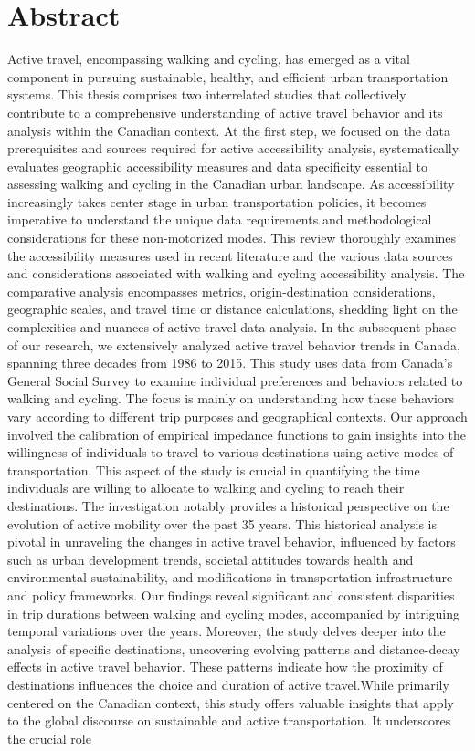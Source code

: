 \documentclass[
11pt, %
oneside, %
english, %
singlespacing, %
]{macthesis} %
\begin{document}
\section*{\Huge Abstract}
\addchaptertocentry{\abstractname}
Active travel, encompassing walking and cycling, has emerged as a vital component in pursuing sustainable, healthy, and efficient urban transportation systems. This thesis comprises two interrelated studies that collectively contribute to a comprehensive understanding of active travel behavior and its analysis within the Canadian context. At the first step, we focused on the data prerequisites and sources required for active accessibility analysis, systematically evaluates geographic accessibility measures and data specificity essential to assessing walking and cycling in the Canadian urban landscape. As accessibility increasingly takes center stage in urban transportation policies, it becomes imperative to understand the unique data requirements and methodological considerations for these non-motorized modes. This review thoroughly examines the accessibility measures used in recent literature and the various data sources and considerations associated with walking and cycling accessibility analysis. The comparative analysis encompasses metrics, origin-destination considerations, geographic scales, and travel time or distance calculations, shedding light on the complexities and nuances of active travel data analysis. In the subsequent phase of our research, we extensively analyzed active travel behavior trends in Canada, spanning three decades from 1986 to 2015. This study uses data from Canada's General Social Survey to examine individual preferences and behaviors related to walking and cycling. The focus is mainly on understanding how these behaviors vary according to different trip purposes and geographical contexts. Our approach involved the calibration of empirical impedance functions to gain insights into the willingness of individuals to travel to various destinations using active modes of transportation. This aspect of the study is crucial in quantifying the time individuals are willing to allocate to walking and cycling to reach their destinations. The investigation notably provides a historical perspective on the evolution of active mobility over the past 35 years. This historical analysis is pivotal in unraveling the changes in active travel behavior, influenced by factors such as urban development trends, societal attitudes towards health and environmental sustainability, and modifications in transportation infrastructure and policy frameworks. Our findings reveal significant and consistent disparities in trip durations between walking and cycling modes, accompanied by intriguing temporal variations over the years. Moreover, the study delves deeper into the analysis of specific destinations, uncovering evolving patterns and distance-decay effects in active travel behavior. These patterns indicate how the proximity of destinations influences the choice and duration of active travel.While primarily centered on the Canadian context, this study offers valuable insights that apply to the global discourse on sustainable and active transportation. It underscores the crucial role 
\end{document}
